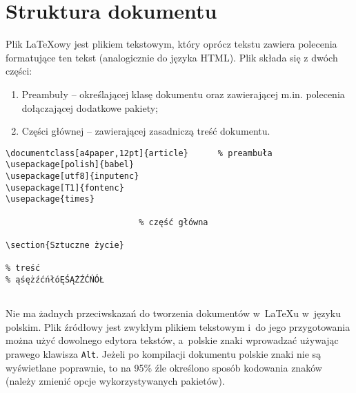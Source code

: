 





\section{Struktura dokumentu}
\label{sec:strukturaDokumentu}

Plik \LaTeX owy jest plikiem tekstowym, który oprócz tekstu zawiera polecenia formatujące ten tekst (analogicznie do języka HTML). Plik składa się z dwóch części:
\begin{enumerate}%
\item Preambuły -- określającej klasę dokumentu oraz zawierającej m.in. polecenia dołączającej dodatkowe pakiety;

\item Części głównej -- zawierającej zasadniczą treść dokumentu.
\end{enumerate}


\begin{lstlisting}
\documentclass[a4paper,12pt]{article}      % preambuła
\usepackage[polish]{babel}
\usepackage[utf8]{inputenc}
\usepackage[T1]{fontenc}
\usepackage{times}

                           % część główna

\section{Sztuczne życie}

% treść
% ąśężźćńłóĘŚĄŻŹĆŃÓŁ


\end{lstlisting}

Nie ma żadnych przeciwskazań do tworzenia dokumentów w~\LaTeX u w~języku polskim. Plik źródłowy jest zwykłym plikiem tekstowym i~do jego przygotowania można użyć dowolnego edytora tekstów, a~polskie znaki wprowadzać używając prawego klawisza \texttt{Alt}. Jeżeli po kompilacji dokumentu polskie znaki nie są wyświetlane poprawnie, to na 95\% źle określono sposób kodowania znaków (należy zmienić opcje wykorzystywanych pakietów).



